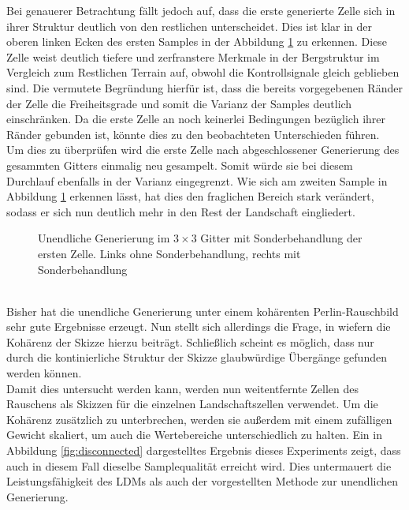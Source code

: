 Bei genauerer Betrachtung fällt jedoch auf, dass die erste generierte Zelle sich in ihrer Struktur deutlich von den restlichen unterscheidet. Dies ist klar in der oberen linken Ecken des ersten Samples in der Abbildung \ref{fig:1st_regen} zu erkennen. Diese Zelle weist deutlich tiefere und zerfranstere Merkmale in der Bergstruktur im Vergleich zum Restlichen Terrain auf, obwohl die Kontrollsignale gleich geblieben sind. Die vermutete Begründung hierfür ist, dass die bereits vorgegebenen Ränder der Zelle die Freiheitsgrade und somit die Varianz der Samples deutlich einschränken. Da die erste Zelle an noch keinerlei Bedingungen bezüglich ihrer Ränder gebunden ist, könnte dies zu den beobachteten Unterschieden führen. \\ 
Um dies zu überprüfen wird die erste Zelle nach abgeschlossener Generierung des gesammten Gitters einmalig neu gesampelt. Somit würde sie bei diesem Durchlauf ebenfalls in der Varianz eingegrenzt. Wie sich am zweiten Sample in Abbildung \ref{fig:1st_regen} erkennen lässt, hat dies den fraglichen Bereich stark verändert, sodass er sich nun deutlich mehr in den Rest der Landschaft eingliedert. 
\begin{figure}[htbp]
    \centering
    \caption{Unendliche Generierung im $3\times3$ Gitter mit Sonderbehandlung der ersten Zelle. Links ohne Sonderbehandlung, rechts mit Sonderbehandlung}
    \label{fig:1st_regen}
\end{figure} \\
Bisher hat die unendliche Generierung unter einem kohärenten Perlin-Rauschbild sehr gute Ergebnisse erzeugt. Nun stellt sich allerdings die Frage, in wiefern die Kohärenz der Skizze hierzu beiträgt. Schließlich scheint es möglich, dass nur durch die kontinierliche Struktur der Skizze glaubwürdige Übergänge gefunden werden können. \\
Damit dies untersucht werden kann, werden nun weitentfernte Zellen des Rauschens als Skizzen für die einzelnen Landschaftszellen verwendet. Um die Kohärenz zusätzlich zu unterbrechen, werden sie außerdem mit einem zufälligen Gewicht skaliert, um auch die Wertebereiche unterschiedlich zu halten. Ein in Abbildung \ref{fig:disconnected} dargestelltes Ergebnis dieses Experiments zeigt, dass auch in diesem Fall dieselbe Samplequalität erreicht wird. Dies untermauert die Leistungsfähigkeit des \ac{LDM}s als auch der vorgestellten Methode zur unendlichen Generierung.  
